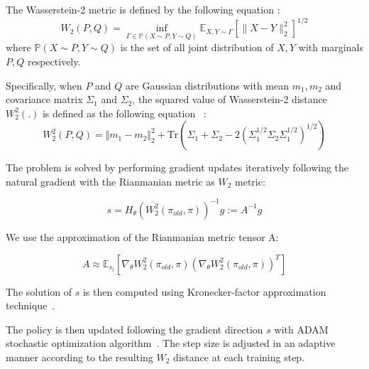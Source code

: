 The Wasserstein-2 metric is defined by the following equation \cite{villani2003topics}:
\begin{equation}
    W_2(P,Q) = 
    \inf_{\Gamma \in \mathbb{P}(X \sim P, Y \sim Q)}
    \mathbb{E}_{X,Y \sim \Gamma} \left[ \lVert X-Y \rVert_2^2 \right]^{1/2}
\end{equation}
where $\mathbb{P}(X \sim P, Y \sim Q)$ is the set of all joint distribution of $X,Y$ with marginals $P,Q$ respectively.

Specifically, when $P$ and $Q$ are Gaussian distributions with mean $m_1,m_2$ and covariance matrix $\Sigma_1$ and $\Sigma_2$, the squared value of Wasserstein-2 distance $W_2^2(.)$ is defined as the following equation~\cite{chafai} :
\begin{equation}
    W_2^2(P,Q) = \Vert m_1-m_2\Vert_2^2 +\mathrm{Tr}\left(\Sigma_1+\Sigma_2-2(\Sigma_1^{1/2}\Sigma_2\Sigma_1^{1/2})^{1/2}\right)
\end{equation}

The problem is solved by performing gradient updates iteratively following the natural gradient with the Rianmanian metric as $W_2$ metric:

\begin{equation}
    s=H_\theta\left( \overline{W_2^2}(\pi_{old},\pi) \right)^{-1}g := A^{-1}g
\end{equation}

We use the approximation of the Rianmanian metric tensor A:

\begin{equation}
    A \approx \mathbb{E}_{s_t} \left[
    \nabla_\theta W_2^2(\pi_{old},\pi) \left(\nabla_\theta W_2^2(\pi_{old},\pi) \right)^T
    \right]
\end{equation}

The solution of $s$ is then computed using Kronecker-factor approximation technique~\cite{wu2017scalable}.

The policy is then updated following the gradient direction $s$ with ADAM stochastic optimization algorithm~\cite{kingma2014adam}. The step size is adjusted in an adaptive manner according to the resulting $W_2$ distance at each training step.